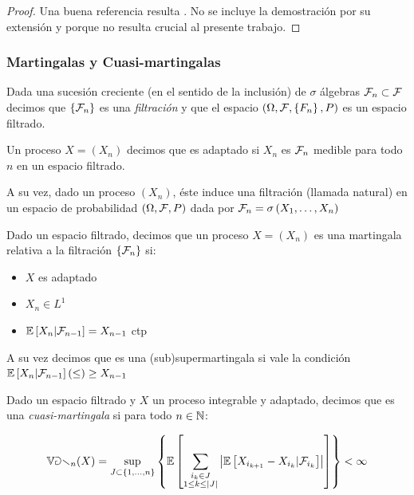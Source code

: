 \begin{proof}
	Una buena referencia resulta \cite{williams:1991}. No se incluye la demostraci\'on por su extensi\'on y porque no resulta crucial al presente trabajo.
\end{proof}

\subsubsection{Martingalas y Cuasi-martingalas}

\begin{definition}
	Dada una sucesi\'on creciente (en el sentido de la inclusi\'on) de $\sigma$ \'algebras $\mathcal{F}_n \subset \mathcal{F}$ decimos que $\left\lbrace\mathcal{F}_n\right\rbrace$ es una \textit{filtraci\'on} y que el espacio $\left(\Omega, \mathcal{F}, \left\lbrace F_n\right\rbrace, P\right)$ es un espacio filtrado.
	
	Un proceso $X  = \left(X_n\right)$ decimos que es adaptado si $X_n $ es $\mathcal{F}_n$ medible para todo $n$ en un espacio filtrado.
	
	A su vez, dado un proceso $\left(X_n\right)$, \'este induce una filtraci\'on (llamada natural) en un espacio de probabilidad $\left(\Omega, \mathcal{F}, P\right)$ dada por $\mathcal{F}_n = \sigma\left(X_1, \dots, X_n \right)$
	
\end{definition}

\begin{definition}
	Dado un espacio filtrado, decimos que un proceso $X = \left(X_n\right)$ es una martingala relativa a la filtraci\'on $\left\lbrace\mathcal{F}_n\right\rbrace$ si:
	
	\begin{itemize}
		\item $X$ es adaptado
		\item $X_n \in L^1$
		\item $\mathbb{E} \left[X_n \vert \mathcal{F}_{n-1}\right] = X_{n-1}$ ctp
	\end{itemize}

	A su vez decimos que es una (sub)supermartingala si vale la condici\'on $\mathbb{E} \left[X_n \vert \mathcal{F}_{n-1}\right] (\leq)\geq X_{n-1}$
	
\end{definition}

\begin{definition}
	Dado un espacio filtrado y $X$ un proceso integrable y adaptado, decimos que es una \textit{cuasi-martingala} si para todo $n \in {\mathbb{N}}$:
	
	\begin{equation}
		\mathbb{Var}_n(X) = \sup\limits_{J \subset \left\lbrace1, \dots, n\right\rbrace} \left\lbrace\mathbb{E} \left[\sum\limits_{\substack{i_k \in J \\ 1 \leq k \leq \left\lvert J\right\rvert}}{\left\lvert\mathbb{E} \left[X_{i_{k+1}} - X_{i_k} \vert \mathcal{F}_{i_{k}}\right]\right\rvert}\right]\right\rbrace < \infty
	\end{equation}
	
\end{definition}

